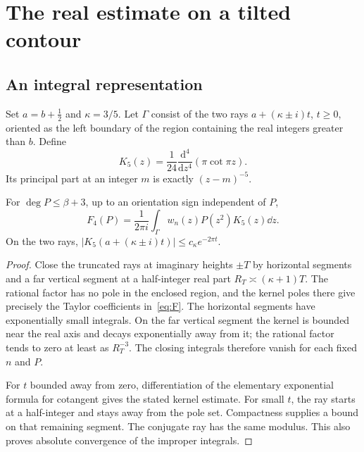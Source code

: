 \section{The real estimate on a tilted contour}\label{sec:real}
\subsection{An integral representation}
Set $a=b+\tfrac12$ and $\kappa=3/5$.  Let $\Gamma$ consist of the
two rays $a+(\kappa\pm i)t$, $t\ge0$, oriented as the left boundary
of the region containing the real integers greater than $b$.  Define
\[
 K_5(z)=\frac1{24}\frac{\mathrm d^4}{\mathrm dz^4}(\pi\cot\pi z).
\]
Its principal part at an integer $m$ is exactly $(z-m)^{-5}$.
\begin{lemma}\label{lem:contour}
For $\deg P\le\beta+3$, up to an orientation sign independent of $P$,
\begin{equation}\label{eq:contour}
 F_4(P)=\frac1{2\pi i}\int_\Gamma w_n(z)P(z^2)K_5(z)\dd z.
\end{equation}
On the two rays, $|K_5(a+(\kappa\pm i)t)|\le c_\kappa e^{-2\pi t}$.
\end{lemma}
\begin{proof}
Close the truncated rays at imaginary heights $\pm T$ by horizontal
segments and a far vertical segment at a half-integer real part
$R_T\asymp(\kappa+1)T$.  The rational factor has no pole in the
enclosed region, and the kernel poles there give precisely the Taylor
coefficients in~\eqref{eq:F}.  The horizontal segments have exponentially
small integrals.  On the far vertical segment the kernel is bounded
near the real axis and decays exponentially away from it; the rational
factor tends to zero at least as $R_T^{-3}$.  The closing integrals
therefore vanish for each fixed $n$ and $P$.

For $t$ bounded away from zero, differentiation of the elementary
exponential formula for cotangent gives the stated kernel estimate.
For small $t$, the ray starts at a half-integer and stays away from
the pole set.  Compactness supplies a bound on that remaining segment.
The conjugate ray has the same modulus.  This also proves absolute
convergence of the improper integrals.
\end{proof}

